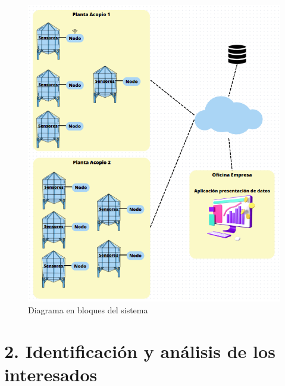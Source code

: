 \documentclass[
11pt, %
]{charter}
\begin{document}
\begin{figure}[htpb]
\centering 
\includegraphics[width=.9\textwidth]{./Figuras/PlantaAcopio.png}
\caption{Diagrama en bloques del sistema}
\label{fig:diagBloques}
\end{figure}

\vspace{25px}

\section{2. Identificación y análisis de los interesados}
\label{sec:interesados}
\end{document}
